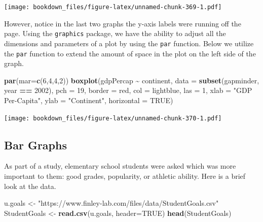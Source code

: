 \documentclass[
]{krantz}
\makeatletter
\newenvironment{Shaded}{\begin{snugshade}}{\end{snugshade}}
\newcommand{\DataTypeTok}[1]{\textcolor[rgb]{0.27,0.27,0.27}{#1}}
\newcommand{\DecValTok}[1]{\textcolor[rgb]{0.06,0.06,0.06}{#1}}
\newcommand{\KeywordTok}[1]{\textcolor[rgb]{0.27,0.27,0.27}{\textbf{#1}}}
\newcommand{\NormalTok}[1]{#1}
\newcommand{\OperatorTok}[1]{\textcolor[rgb]{0.43,0.43,0.43}{\textbf{#1}}}
\newcommand{\OtherTok}[1]{\textcolor[rgb]{0.37,0.37,0.37}{#1}}
\newcommand{\StringTok}[1]{\textcolor[rgb]{0.5,0.5,0.5}{#1}}
\newenvironment{kframe}{%
\medskip{}
\setlength{\fboxsep}{.8em}
 \def\at@end@of@kframe{}%
 \ifinner\ifhmode%
  \def\at@end@of@kframe{\end{minipage}}%
  \begin{minipage}{\columnwidth}%
 \fi\fi%
 \def\FrameCommand##1{\hskip\@totalleftmargin \hskip-\fboxsep
 \colorbox{shadecolor}{##1}\hskip-\fboxsep
     \hskip-\linewidth \hskip-\@totalleftmargin \hskip\columnwidth}%
 \MakeFramed {\advance\hsize-\width
   \@totalleftmargin\z@ \linewidth\hsize
   \@setminipage}}%
 {\par\unskip\endMakeFramed%
 \at@end@of@kframe}
\renewenvironment{Shaded}{\begin{kframe}}{\end{kframe}}
\makeatother
\begin{document}
\texttt{[image: bookdown\_files/figure-latex/unnamed-chunk-369-1.pdf]}

However, notice in the last two graphs the y-axis labels were running off the page. Using the \texttt{graphics} package, we have the ability to adjust all the dimensions and parameters of a plot by using the \texttt{par} function. Below we utilize the \texttt{par} function to extend the amount of space in the plot on the left side of the graph.

\begin{Shaded}
\begin{Highlighting}[]
\KeywordTok{par}\NormalTok{(}\DataTypeTok{mar=}\KeywordTok{c}\NormalTok{(}\DecValTok{6}\NormalTok{,}\DecValTok{4}\NormalTok{,}\DecValTok{4}\NormalTok{,}\DecValTok{2}\NormalTok{))}
\KeywordTok{boxplot}\NormalTok{(gdpPercap }\OperatorTok{\textasciitilde{}}\StringTok{ }\NormalTok{continent, }\DataTypeTok{data =} \KeywordTok{subset}\NormalTok{(gapminder, year }\OperatorTok{==}\StringTok{ }\DecValTok{2002}\NormalTok{), }\DataTypeTok{pch =} \DecValTok{19}\NormalTok{, }\DataTypeTok{border =} \StringTok{\textquotesingle{}red\textquotesingle{}}\NormalTok{, }\DataTypeTok{col =} \StringTok{\textquotesingle{}lightblue\textquotesingle{}}\NormalTok{, }\DataTypeTok{las =} \DecValTok{1}\NormalTok{, }\DataTypeTok{xlab =} \StringTok{"GDP Per{-}Capita"}\NormalTok{, }\DataTypeTok{ylab =} \StringTok{"Continent"}\NormalTok{, }\DataTypeTok{horizontal =} \OtherTok{TRUE}\NormalTok{)}
\end{Highlighting}
\end{Shaded}

\texttt{[image: bookdown\_files/figure-latex/unnamed-chunk-370-1.pdf]}

\hypertarget{graphics10}{%
\subsection{Bar Graphs}\label{graphics10}}

As part of a study, elementary school students were asked which was more important to them: good grades, popularity, or athletic ability. Here is a brief look at the data.

\begin{Shaded}
\begin{Highlighting}[]
\NormalTok{u.goals \textless{}{-}}\StringTok{ "https://www.finley{-}lab.com/files/data/StudentGoals.csv"}
\NormalTok{StudentGoals \textless{}{-}}\StringTok{ }\KeywordTok{read.csv}\NormalTok{(u.goals, }\DataTypeTok{header=}\OtherTok{TRUE}\NormalTok{)}
\KeywordTok{head}\NormalTok{(StudentGoals)}
\end{Highlighting}
\end{Shaded}
\end{document}
